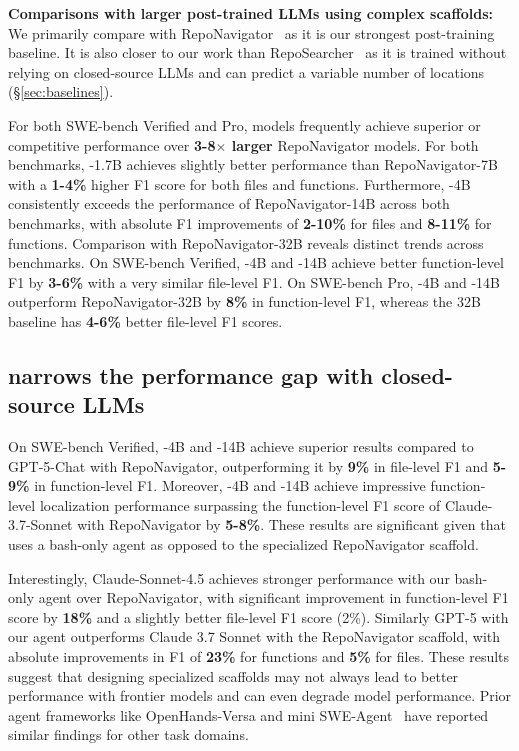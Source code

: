 \textbf{Comparisons with larger post-trained LLMs using complex scaffolds:} We primarily compare \methodname with RepoNavigator~\citep{zhang2025one} as it is our strongest post-training baseline. It is also closer to our work than  RepoSearcher~\citep{ma2025toolintegratedreinforcementlearningrepo} as it is trained without relying on closed-source LLMs and can predict a variable number of locations (\S\ref{sec:baselines}).

For both SWE-bench Verified and Pro, \methodname models frequently achieve superior or competitive performance over \textbf{3-8$\times$ larger} RepoNavigator models. For both benchmarks, \methodname-1.7B achieves slightly better performance than RepoNavigator-7B  with a \textbf{1-4\%} higher F1 score for both files and functions. Furthermore, \methodname-4B consistently exceeds the performance of RepoNavigator-14B across both benchmarks, with absolute F1 improvements of \textbf{2-10\%} for files and \textbf{8-11\%} for functions. Comparison with RepoNavigator-32B reveals distinct trends across benchmarks. On SWE-bench Verified, \methodname-4B and \methodname-14B achieve better function-level F1 by \textbf{3-6\%} with a very similar file-level F1. On SWE-bench Pro, \methodname-4B and \methodname-14B outperform RepoNavigator-32B by \textbf{8\%} in function-level F1, whereas the 32B baseline has \textbf{4-6\%} better file-level F1 scores.

\subsection{\methodname narrows the performance gap with closed-source LLMs}
On SWE-bench Verified, \methodname-4B and \methodname-14B achieve superior results compared to GPT-5-Chat with RepoNavigator, outperforming it by \textbf{9\%} in file-level F1 and \textbf{5-9\%} in function-level F1. Moreover, \methodname-4B and \methodname-14B achieve impressive function-level localization performance surpassing the function-level F1 score of Claude-3.7-Sonnet with RepoNavigator by \textbf{5-8\%}. These results are significant given that \methodname uses a bash-only agent as opposed to the specialized RepoNavigator scaffold.

Interestingly, Claude-Sonnet-4.5 achieves stronger performance with our bash-only agent over RepoNavigator, with significant improvement in function-level F1 score by \textbf{18\%} and a slightly better file-level F1 score (2\%). Similarly GPT-5 with our agent outperforms Claude 3.7 Sonnet with the RepoNavigator scaffold, with absolute improvements in F1 of \textbf{23\%} for functions and \textbf{5\%} for files. These results suggest that designing specialized scaffolds may not always lead to better performance with frontier models and can even degrade model performance. Prior agent frameworks like OpenHands-Versa \citep{soni2025codingagentsmultimodalbrowsing} and mini SWE-Agent~\citep{mini_swe_agent_repo,yang2024sweagentagentcomputerinterfacesenable} have reported similar findings for other task domains.

